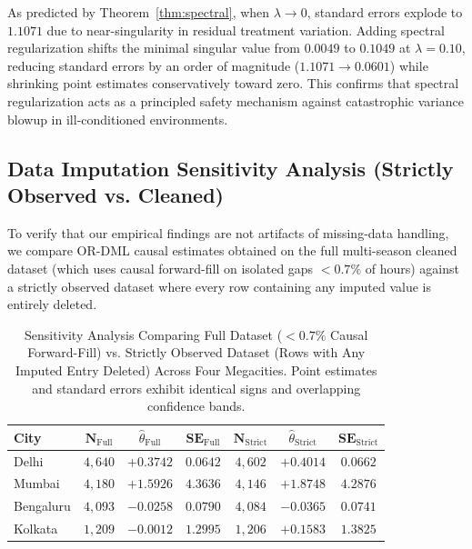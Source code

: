 \documentclass[twoside]{article}
\theoremstyle{definition}
\begin{document}
As predicted by Theorem~\ref{thm:spectral}, when $\lambda \to 0$, standard errors explode to $1.1071$ due to near-singularity in residual treatment variation. Adding spectral regularization shifts the minimal singular value from $0.0049$ to $0.1049$ at $\lambda=0.10$, reducing standard errors by an order of magnitude ($1.1071 \to 0.0601$) while shrinking point estimates conservatively toward zero. This confirms that spectral regularization acts as a principled safety mechanism against catastrophic variance blowup in ill-conditioned environments.

\subsection{Data Imputation Sensitivity Analysis (Strictly Observed vs. Cleaned)}
\label{app:imputation_sensitivity}
To verify that our empirical findings are not artifacts of missing-data handling, we compare OR-DML causal estimates obtained on the full multi-season cleaned dataset (which uses causal forward-fill on isolated gaps $<0.7\%$ of hours) against a strictly observed dataset where every row containing any imputed value is entirely deleted.

\begin{table}[!ht]
\centering
\footnotesize
\renewcommand{\arraystretch}{0.78}
\caption{Sensitivity Analysis Comparing Full Dataset ($<0.7\%$ Causal Forward-Fill) vs. Strictly Observed Dataset (Rows with Any Imputed Entry Deleted) Across Four Megacities. Point estimates and standard errors exhibit identical signs and overlapping confidence bands.}
\label{tab:imputation_sensitivity}
\begin{tabular}{lcccccc}
\toprule
\textbf{City} & $\boldsymbol{N}_{\mathrm{Full}}$ & $\hat{\theta}_{\mathrm{Full}}$ & $\mathbf{SE}_{\mathrm{Full}}$ & $\boldsymbol{N}_{\mathrm{Strict}}$ & $\hat{\theta}_{\mathrm{Strict}}$ & $\mathbf{SE}_{\mathrm{Strict}}$ \\
\midrule
Delhi & $4,640$ & $+0.3742$ & $0.0642$ & $4,602$ & $+0.4014$ & $0.0662$ \\
Mumbai & $4,180$ & $+1.5926$ & $4.3636$ & $4,146$ & $+1.8748$ & $4.2876$ \\
Bengaluru & $4,093$ & $-0.0258$ & $0.0790$ & $4,084$ & $-0.0365$ & $0.0741$ \\
Kolkata & $1,209$ & $-0.0012$ & $1.2995$ & $1,206$ & $+0.1583$ & $1.3825$ \\
\bottomrule
\end{tabular}
\end{table}
\end{document}
